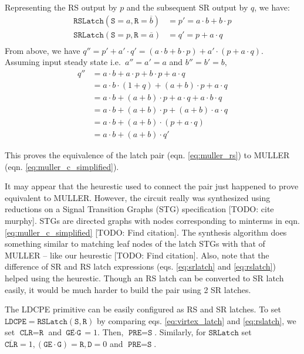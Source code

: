Representing the RS output by $p$ and the subsequent SR output by $q$,
we have:
\begin{equation}\label{eq:muller_rs}
\begin{split}
	\texttt{RSLatch}(\texttt{S}=a, \texttt{R}=\overline{b}) &= p' = a \cdot b + b \cdot p \\
	\texttt{SRLatch}(\texttt{S}=p, \texttt{R}=\overline{a}) &= q' = p + a \cdot q \\
\end{split}
\end{equation}
From above, we have $q'' = p' + a' \cdot q' = (a \cdot b + b \cdot p) + 
a' \cdot (p + a \cdot q)$. 
Assuming input steady state i.e.\ $a'' = a' = a$ and $b'' = b' = b$,
\begin{equation}
\begin{split}
	q''& = a \cdot b + a \cdot p + b \cdot p + a \cdot q\\
	&= a \cdot b \cdot (1 + q) + (a + b ) \cdot p + a \cdot q\\
	&= a \cdot b + (a + b ) \cdot p + a \cdot q + a \cdot b \cdot q\\
	&= a \cdot b + (a + b ) \cdot p + (a + b) \cdot a \cdot q\\
	&= a \cdot b + (a + b ) \cdot (p + a \cdot q)\\
	&= a \cdot b + (a + b ) \cdot q'
\end{split}
\end{equation}

This proves the equivalence of the latch pair (eqn. \ref{eq:muller_rs}) to MULLER
(eqn. \ref{eq:muller_c_simplified}).

It may appear that the heurestic used to connect the pair just happened to
prove equivalent to MULLER. 
However, the circuit really was synthesized using reductions on a 
Signal Transition Graphs (STG) specification [TODO: cite murphy]. 
STGs are directed graphs with nodes corresponding to minterms in eqn.
\ref{eq:muller_c_simplified} [TODO: Find citation]. 
The synthesis algorithm does something similar to matching leaf nodes of the
latch STGs with that of MULLER -- like our heurestic [TODO: Find
citation]. 
Also, note that the difference of SR and RS latch expressions (eqs.
\ref{eq:srlatch} and \ref{eq:rslatch}) helped using the heurestic. 
Though an RS latch can be converted to SR latch easily, it would be much harder
to build the pair using 2 SR latches.

The LDCPE primitive can be easily configured as RS and SR latches. 
To set $\texttt{LDCPE} = \texttt{RSLatch}(\texttt{S}, \texttt{R})$ by comparing
eqs. \ref{eq:virtex_latch} and \ref{eq:rslatch}, we set
$\texttt{CLR} = \texttt{R}$ and $\overline{\texttt{GE} \cdot \texttt{G}} = 1$.
Then, $\texttt{PRE} = \texttt{S}$.
Similarly, for $\texttt{SRLatch}$ set $\overline{\texttt{CLR}} = 1,
 (\texttt{GE} \cdot \texttt{G}) = \texttt{R}, \texttt{D} = 0$ and $\texttt{PRE}
 = \texttt{S}$.

